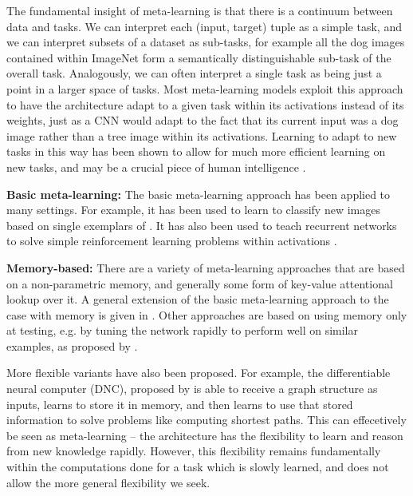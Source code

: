 \documentclass[11pt]{article}
\begin{document}
The fundamental insight of meta-learning is that there is a continuum between data and tasks. We can interpret each (input, target) tuple as a simple task, and we can interpret subsets of a dataset as sub-tasks, for example all the dog images contained within ImageNet form a semantically distinguishable sub-task of the overall task. Analogously, we can often interpret a single task as being just a point in a larger space of tasks. Most meta-learning models exploit this approach to have the architecture adapt to a given task within its activations instead of its weights, just as a CNN would adapt to the fact that its current input was a dog image rather than a tree image within its activations. Learning to adapt to new tasks in this way has been shown to allow for much more efficient learning on new tasks, and may be a crucial piece of human intelligence \citep{Hansen2017}. \par 
\textbf{Basic meta-learning:}
The basic meta-learning approach has been applied to many settings. For example, it has been used to learn to classify new images based on single exemplars of \citep{Vinyals2016}. It has also been used to teach recurrent networks to solve simple reinforcement learning problems within activations \citep{Duan2016, Wang2016a}. \par
\textbf{Memory-based:} There are a variety of meta-learning approaches that are based on a non-parametric memory, and generally some form of key-value attentional lookup over it. A general extension of the basic meta-learning approach to the case with memory is given in \citet{Santoro2016}. Other approaches are based on using memory only at testing, e.g. by tuning the network rapidly to perform well on similar examples, as proposed by \citet{Sprechmann2018}. \par 
More flexible variants have also been proposed. For example, the differentiable neural computer (DNC), proposed by \citet{Graves2016} is able to receive a graph structure as inputs, learns to store it in memory, and then learns to use that stored information to solve problems like computing shortest paths. This can effecetively be seen as meta-learning -- the architecture has the flexibility to learn and reason from new knowledge rapidly. However, this flexibility remains fundamentally within the computations done for a task which is slowly learned, and does not allow the more general flexibility we seek. \par
\end{document}
